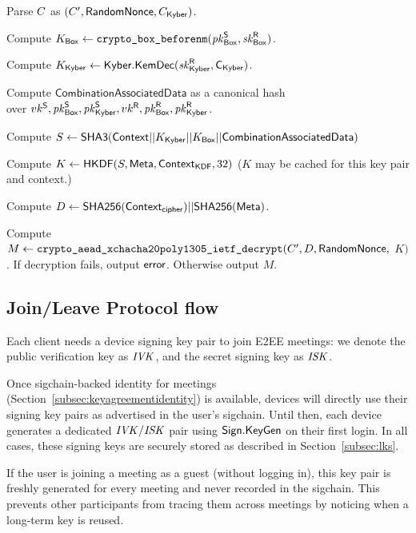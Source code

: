 \vspace{-1em}
\begingroup
\RaggedRight
\begin{enumerate*}
\item Parse $C$ as $(C', {\sf RandomNonce}, C_{\sf Kyber})$.
\item Compute $K_{\sf Box} \leftarrow \texttt{crypto\_box\_beforenm}(\mathit{pk}_{{\sf Box}}^{\sf S}, \mathit{sk}_{{\sf Box}}^{\sf R})$.
\item Compute $K_{\sf Kyber} \leftarrow {\sf Kyber}.\sf{KemDec}(\mathit{sk}_{{\sf Kyber}}^{\sf R},C_{\sf Kyber})$.
\item Compute $\textsf{CombinationAssociatedData}$ as a canonical hash \\ over $vk^\textsf{S}, \mathit{pk}_{{\sf Box}}^{\sf S}, \mathit{pk}_{{\sf Kyber}}^{\sf S}, vk^\textsf{R}, \mathit{pk}_{{\sf Box}}^{\sf R}, \mathit{pk}_{{\sf Kyber}}^{\sf R}$.
\item Compute $S \leftarrow {\sf SHA3}({\sf Context} || K_{\sf Kyber} || K_{\sf Box} || \textsf{CombinationAssociatedData})$
\item Compute $K \leftarrow {\sf HKDF}(S, {\sf Meta}, {\sf Context}_{\textsf{KDF}}, 32)$
($K$ may be cached for this key pair and context.)
\item Compute $D \leftarrow {\sf SHA256}({\sf Context}_\textsf{cipher}) || {\sf SHA256}({\sf Meta})$.
\item Compute $M \leftarrow \texttt{crypto\_aead\_xchacha20poly1305\_ietf\_decrypt}(C', D,
{\sf RandomNonce},$ $K)$. If decryption fails, output ${\sf error}$. Otherwise output $M$.
\end{enumerate*}
\endgroup

\subsection{Join/Leave Protocol flow}\label{subsec:joinleave}

Each client needs a device signing key pair to join E2EE meetings: we denote the public verification
key as $\mathit{IVK}$, and the secret signing key as $\mathit{ISK}$.

Once sigchain-backed identity for meetings (Section~\ref{subsec:keyagreementidentity}) is available,
devices will directly use their signing key pairs as advertised in the user's sigchain.  Until then,
each device generates a dedicated $\mathit{IVK}/\mathit{ISK}$ pair using ${\sf Sign}.\mathsf{KeyGen}$ on their first login. In
all cases, these signing keys are securely stored as described in Section~\ref{subsec:lks}.

If the user is joining a meeting as a guest (without logging in), this key pair
is freshly generated for every meeting and never recorded in the sigchain. This
prevents other participants from tracing them
across meetings by noticing when a long-term key is reused.

